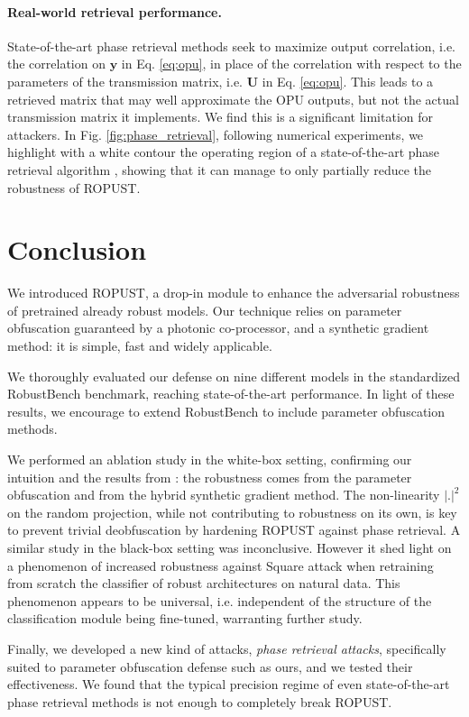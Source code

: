 \paragraph{Real-world retrieval performance.} State-of-the-art phase retrieval methods seek to maximize output correlation, i.e. the correlation on $\mathbf{y}$ in Eq. \ref{eq:opu}, in place of the correlation with respect to the parameters of the transmission matrix, i.e. $\mathbf{U}$ in Eq. \ref{eq:opu}. This leads to a retrieved matrix that may well approximate the OPU outputs, but not the actual transmission matrix it implements. We find this is a significant limitation for attackers. In Fig. \ref{fig:phase_retrieval}, following numerical experiments, we highlight with a white contour the operating region of a state-of-the-art phase retrieval algorithm \cite{Gupta2020FastOS}, showing that it can manage to only partially reduce the robustness of ROPUST. 
\section{Conclusion}
We introduced ROPUST, a drop-in module to enhance the adversarial robustness of pretrained already robust models. Our technique relies on parameter obfuscation guaranteed by a photonic co-processor, and a synthetic gradient method: it is simple, fast and widely applicable.

We thoroughly evaluated our defense on nine different models in the standardized RobustBench benchmark, reaching state-of-the-art performance. In light of these results, we encourage to extend RobustBench to include parameter obfuscation methods. 

We performed an ablation study in the white-box setting, confirming our intuition and the results from \cite{Cappelli2021AdversarialRB}: the robustness comes from the parameter obfuscation and from the hybrid synthetic gradient method. The non-linearity $|.|^2$ on the random projection, while not contributing to robustness on its own, is key to prevent trivial deobfuscation by hardening ROPUST against phase retrieval.  A similar study in the black-box setting was inconclusive. However it shed light on a phenomenon of increased robustness against Square attack when retraining from scratch the classifier of robust architectures on natural data. This phenomenon appears to be universal, i.e. independent of the structure of the classification module being fine-tuned, warranting further study. 

Finally, we developed a new kind of attacks, \textit{phase retrieval attacks}, specifically suited to parameter obfuscation defense such as ours, and we tested their effectiveness. We found that the typical precision regime of even state-of-the-art phase retrieval methods is not enough to completely break ROPUST.

